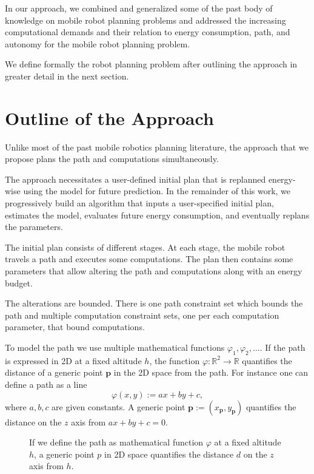 In our approach, we combined and generalized some of the past body of knowledge on mobile robot planning problems and addressed the increasing computational demands and their relation to energy consumption, path, and autonomy for the mobile robot planning problem. 

We define formally the robot planning problem after outlining the approach in greater detail in the next section.


\section{Outline of the Approach}
\label{sec:outline}

Unlike most of the past mobile robotics planning literature, the approach that we propose plans the path and computations simultaneously. 

The approach necessitates a user-defined initial plan that is replanned energy-wise using the model for future prediction. In the remainder of this work, we progressively build an algorithm that inputs a user-specified initial plan, estimates the model, evaluates future energy consumption, and eventually replans the parameters. 

The initial plan consists of different stages. At each stage, the mobile robot travels a path and executes some computations. The plan then contains some parameters that allow altering the path and computations along with an energy budget.

The alterations are bounded. There is one path constraint set which bounds the path and multiple computation constraint sets, one per each computation parameter, that bound computations.

To model the path we use multiple mathematical functions $\varphi_1,\varphi_2,\dots$. If the path is expressed in 2D at a fixed altitude $h$, the function $\varphi:\mathbb{R}^2\rightarrow\mathbb{R}$ quantifies the distance of a generic point $\mathbf{p}$ in the 2D space from the path. For instance one can define a path as a line
\begin{equation}\label{eq:basic-path}
  \varphi(x,y):=ax+by+c,
\end{equation}
where $a,b,c$ are given constants. A generic point $\mathbf{p}:=(x_{\mathbf{p}},y_{\mathbf{p}})$ quantifies the distance on the $z$ axis from $ax+by+c=0$. 

\begin{figure}[t]
  \centering
  
  \caption[Concept of the path and generic point in space]{If we define the path as mathematical function $\varphi$ at a fixed altitude $h$, a generic point $p$ in 2D space quantifies the distance $d$ on the $z$ axis from $h$.}
  \label{fig:plot1}
\end{figure}

